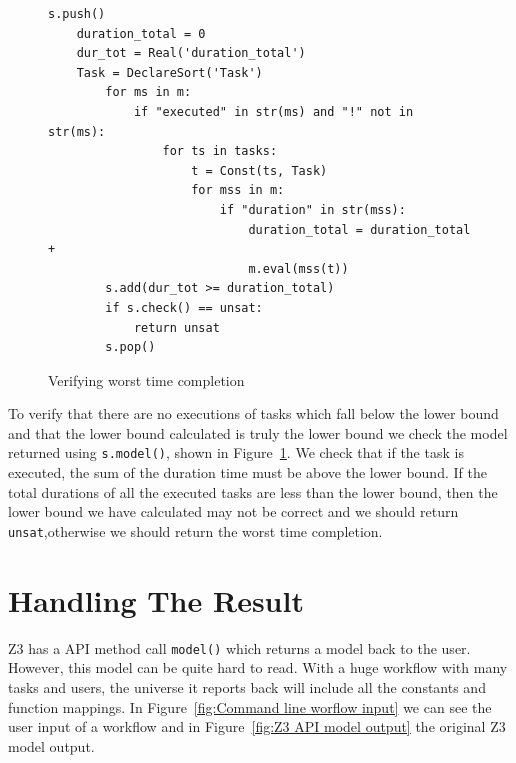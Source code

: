 \documentclass[a4paper]{report}
\begin{document}
\begin{figure}[!h]
\lstset{numbers=left, showspaces=false,
    showstringspaces=false, tabsize=2, breaklines=true,
    xleftmargin=5.0ex,
}
\begin{lstlisting}[frame=single]
s.push()
	duration_total = 0
	dur_tot = Real('duration_total')
	Task = DeclareSort('Task')
		for ms in m:
			if "executed" in str(ms) and "!" not in str(ms):
				for ts in tasks:
					t = Const(ts, Task)
					for mss in m:
						if "duration" in str(mss):
							duration_total = duration_total + 
							m.eval(mss(t))
		s.add(dur_tot >= duration_total)
		if s.check() == unsat:
			return unsat
		s.pop()
\end{lstlisting}
\caption{Verifying worst time completion}
\label{fig:Verifying worst time completion}
\end{figure}

To verify that there are no executions of tasks which fall below the lower bound and that the lower bound calculated is truly the lower bound we check the model returned using \texttt{s.model()}, shown in Figure~\ref{fig:Verifying worst time completion}. We check that if the task is executed, the sum of the duration time must be above the lower bound. If the total durations of all the executed tasks are less than the lower bound, then the lower bound we have calculated may not be correct and we should return \texttt{unsat},otherwise we should return the worst time completion. \\

\section{Handling The Result}
Z3 has a API method call \texttt{model()} which returns a model back to the user. However, this model can be quite hard to read. With a huge workflow with many tasks and users, the universe it reports back will include all the constants and function mappings. In Figure~\ref{fig:Command line worflow input} we can see the user input of a workflow and in Figure~\ref{fig:Z3 API model output} the original Z3 model output. 
\end{document}
